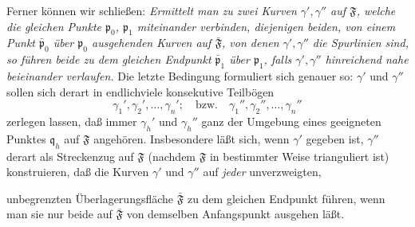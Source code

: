 \documentclass{article}
\begin{document}
Ferner können wir schließen: \emph{Ermittelt man zu zwei Kurven $\gamma', \gamma''$ auf $\mathfrak{F}$, welche die gleichen Punkte $\mathfrak{p}_0$, $\mathfrak{p}_1$ miteinander verbinden, diejenigen beiden, von einem Punkt $\bar{\mathfrak{p}}_0$ über $\mathfrak{p}_0$ ausgehenden Kurven auf $\bar{\mathfrak{F}}$, von denen $\gamma', \gamma''$ die Spurlinien sind, so führen beide zu dem gleichen Endpunkt $\bar{\mathfrak{p}}_1$ über $\mathfrak{p}_1$, falls $\gamma', \gamma''$ hinreichend nahe beieinander verlaufen.} Die letzte Bedingung formuliert sich genauer so: $\gamma'$ und $\gamma''$ sollen sich derart in endlichviele konsekutive Teilbögen
\[ \gamma_1', \gamma_2', \dots, \gamma_n'; \quad \text{bzw.} \quad \gamma_1'', \gamma_2'', \dots, \gamma_n'' \]
zerlegen lassen, daß immer $\gamma_h'$ und $\gamma_h''$ ganz der Umgebung eines geeigneten Punktes $\mathfrak{q}_h$ auf $\mathfrak{F}$ angehören. Insbesondere läßt sich, wenn $\gamma'$ gegeben ist, $\gamma''$ derart als Streckenzug auf $\mathfrak{F}$ (nachdem $\mathfrak{F}$ in bestimmter Weise trianguliert ist) konstruieren, daß die Kurven $\gamma'$ und $\gamma''$ auf \emph{jeder} unverzweigten,

unbegrenzten Überlagerungsfläche $\bar{\mathfrak{F}}$ zu dem gleichen Endpunkt führen, wenn man sie nur beide auf $\bar{\mathfrak{F}}$ von demselben Anfangspunkt ausgehen läßt.
\end{document}

